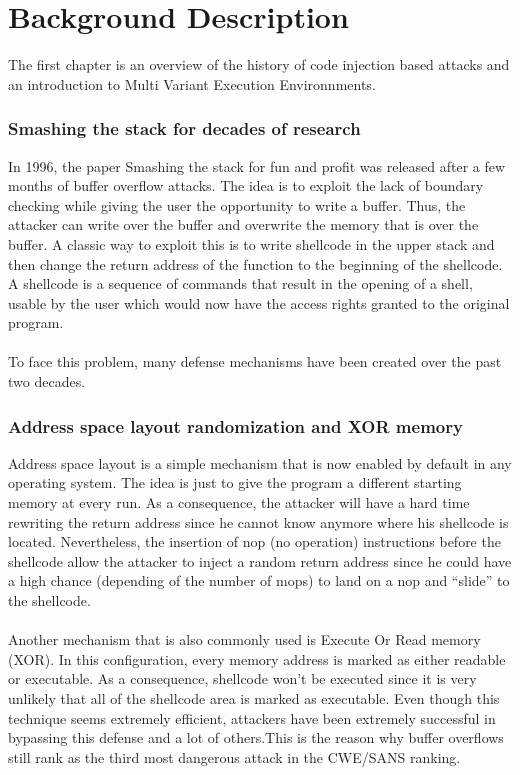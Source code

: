\documentclass[english]{enstaPRE}
\begin{document}
\part{Background Description}
The first chapter is an overview of the history of code injection based attacks and an introduction to Multi Variant Execution Environnments.

\section{Smashing the stack for decades of research}
In 1996, the paper Smashing the stack for fun and profit was released after a few months of buffer overflow attacks.
The idea is to exploit the lack of boundary checking while giving the user the opportunity to write a buffer.
Thus, the attacker can write over the buffer and overwrite the memory that is over the buffer. 
A classic way to exploit this is to write shellcode in the upper stack and then change the return address of the function
to the beginning of the shellcode. A shellcode is a sequence of commands that result in the opening of a shell, usable by the user which
would now have the access rights granted to the original program.\\
 \\

To face this problem, many defense mechanisms have been created over the past two decades.

\section{Address space layout randomization and XOR memory}
Address space layout is a simple mechanism that is now enabled by default in any operating system. The idea is just to give the 
program a different starting memory at every run. As a consequence, the attacker will have a hard time rewriting the return address since
he cannot know anymore where his shellcode is located. 
Nevertheless, the insertion of nop (no operation) instructions before the shellcode allow the attacker to inject a random 
return address since he could have a high chance (depending of the number of mops) to land on a nop and ``slide'' to the shellcode.
\\ \\
Another mechanism that is also commonly used is Execute Or Read memory (XOR). In this configuration, every memory address is marked
as either readable or executable. As a consequence, shellcode won't be executed since it is very unlikely that all of the shellcode
area is marked as executable.
Even though this technique seems extremely efficient, attackers have been extremely successful in bypassing this defense 
and a lot of others.This is the reason why buffer overflows still rank as the third most dangerous attack in the CWE/SANS ranking.\\
 \\
\end{document}
